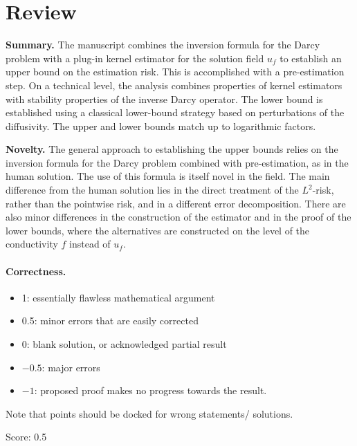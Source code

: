 \documentclass[11pt]{article}
\theoremstyle{remark}
\begin{document}
\maketitle

\section{Review}

\noindent \textbf{Summary.} The manuscript combines the inversion formula for the Darcy problem with a plug-in kernel estimator for the solution field $u_f$ to establish an upper bound on the estimation risk. This is accomplished with a pre-estimation step. On a technical level, the analysis combines properties of kernel estimators with stability properties of the inverse Darcy operator. The lower bound is established using a classical lower-bound strategy based on perturbations of the diffusivity. The upper and lower bounds match up to logarithmic factors.

\noindent \textbf{Novelty.} The general approach to establishing the upper bounds relies on the inversion formula for the Darcy problem combined with pre-estimation, as in the human solution. The use of this formula is itself novel in the field. The main difference from the human solution lies in the direct treatment of the $L^2$-risk, rather than the pointwise risk, and in a different error decomposition. There are also minor differences in the construction of the estimator and in the proof of the lower bounds, where the alternatives are constructed on the level of the conductivity $f$ instead of $u_f$.


\paragraph{Correctness.}
\begin{itemize}
	\item  1: essentially flawless mathematical argument
	\item  0.5: minor errors that are easily corrected
	\item  0: blank solution, or acknowledged partial result
	\item  $-0.5$: major errors
	\item  $-1$: proposed proof makes no progress towards the result.
\end{itemize}
Note that points should be docked for wrong statements/ solutions.

\noindent Score: 0.5
\end{document}
